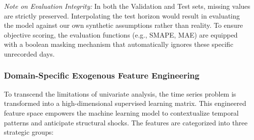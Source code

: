 \documentclass[conference, 12pt, onecolumn]{IEEEtran}
\begin{document}
\textit{Note on Evaluation Integrity:} In both the Validation and Test sets, missing values are strictly preserved. Interpolating the test horizon would result in evaluating the model against our own synthetic assumptions rather than reality. To ensure objective scoring, the evaluation functions (e.g., SMAPE, MAE) are equipped with a boolean masking mechanism that automatically ignores these specific unrecorded days.

\subsubsection{Domain-Specific Exogenous Feature Engineering}
To transcend the limitations of univariate analysis, the time series problem is transformed into a high-dimensional supervised learning matrix. This engineered feature space empowers the machine learning model to contextualize temporal patterns and anticipate structural shocks. The features are categorized into three strategic groups:
\end{document}
